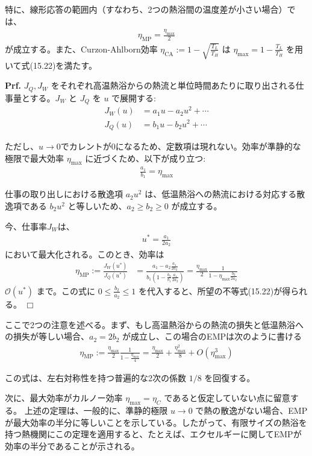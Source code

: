\documentclass[a4paper,11pt]{jsarticle}
\numberwithin{equation}{section}
\begin{document}
特に、線形応答の範囲内（すなわち、2つの熱浴間の温度差が小さい場合）では、
\begin{align}
    \eta_{\text{MP}} = \frac{\eta_{\text{max}}}{2}
\end{align}
が成立する。また、Curzon-Ahlborn効率 $\eta_{\text{CA}} := 1 - \sqrt{\frac{T_L}{T_H}}$ は $\eta_{\text{max}} = 1 - \frac{T_L}{T_H}$ を用いて式(15.22)を満たす。

\textbf{Prf.} $J_Q,J_W$ をそれぞれ高温熱浴からの熱流と単位時間あたりに取り出される仕事量とする。$J_W$ と $J_Q$ を $u$ で展開する:
\begin{align}
    J_W(u) &= a_1 u - a_2 u^2 + \cdots \\
    J_Q(u) &= b_1 u - b_2 u^2 + \cdots
\end{align}

ただし、$u \to 0$でカレントが0になるため、定数項は現れない。効率が準静的な極限で最大効率 $\eta_{\text{max}}$ に近づくため、以下が成り立つ:
\begin{align}
    \frac{a_1}{b_1} = \eta_{\text{max}}
\end{align}

仕事の取り出しにおける散逸項 $a_2 u^2$ は、低温熱浴への熱流における対応する散逸項である $b_2 u^2$ と等しいため、$a_2 \geq b_2 \geq 0$ が成立する。

今、仕事率$J_W$は、
\begin{align}
    u^* = \frac{a_1}{2 a_2}
\end{align}
において最大化される。このとき、効率は
\begin{align}
    \eta_{\text{MP}} := \frac{J_W(u^*)}{J_Q(u^*)} &= \frac{a_1 - a_2 \frac{a_1}{2a_2}}{b_1 \left( 1 - \frac{b_2}{b_1} \frac{a_1}{2a_2} \right)} = \frac{\eta_{\text{max}}}{2} \frac{1}{1 - \eta_{\text{max}} \frac{b_2}{2a_2}}
\end{align}
$\mathcal{O}(u^*)$ まで。この式に $0 \leq \frac{b_2}{a_2} \leq 1$ を代入すると、所望の不等式(15.22)が得られる。 \hfill $\Box$

ここで2つの注意を述べる。まず、もし高温熱浴からの熱流の損失と低温熱浴への損失が等しい場合、$a_2 = 2 b_2$ が成立し、この場合のEMPは次のように書ける
\begin{align}
    \eta_{\text{MP}} := \frac{\eta_{\text{max}}}{2} \frac{1}{1 - \frac{\eta_{\text{max}}}{4}} = \frac{\eta_{\text{max}}}{2} + \frac{\eta_{\text{max}}^2}{8} + {O}(\eta_{\text{max}}^3)
\end{align}

この式は、左右対称性を持つ普遍的な2次の係数 $1/8$ を回復する。

次に、最大効率がカルノー効率 $\eta_{\text{max}} = \eta_C$ であると仮定していない点に留意する。
上述の定理は、一般的に、準静的極限 $u \to 0$ で熱の散逸がない場合、EMPが最大効率の半分に等しいことを示している。したがって、有限サイズの熱浴を持つ熱機関にこの定理を適用すると、たとえば、エクセルギーに関してEMPが効率の半分であることが示される。
\end{document}
